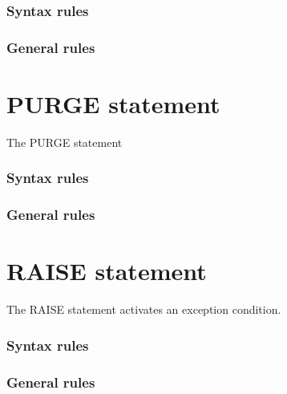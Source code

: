 
\subsubsection{Syntax rules}

\subsubsection{General rules}

\section{PURGE statement}

The PURGE statement

\begin{syntax}[\deletedcolour]
\end{syntax}

\subsubsection{Syntax rules}

\subsubsection{General rules}

\section{RAISE statement}

The RAISE statement activates an exception condition.

\begin{syntax}
\end{syntax}

\subsubsection{Syntax rules}

\subsubsection{General rules}

